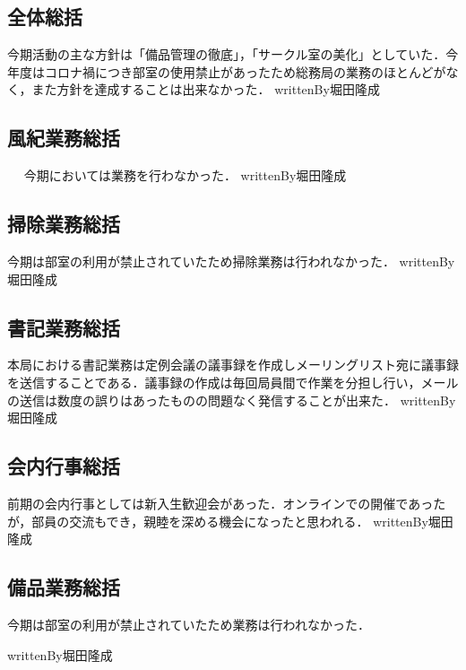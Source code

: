 \subsection*{全体総括}
今期活動の主な方針は「備品管理の徹底」，「サークル室の美化」としていた．今年度はコロナ禍につき部室の使用禁止があったため総務局の業務のほとんどがなく，また方針を達成することは出来なかった．
writtenBy{\soumuChief}{堀田}{隆成}

\subsection*{風紀業務総括}　
今期においては業務を行わなかった．
writtenBy{\soumuChief}{堀田}{隆成}

\subsection*{掃除業務総括}
今期は部室の利用が禁止されていたため掃除業務は行われなかった．
writtenBy{\soumuChief}{堀田}{隆成}

\subsection*{書記業務総括}
本局における書記業務は定例会議の議事録を作成しメーリングリスト宛に議事録を送信することである．議事録の作成は毎回局員間で作業を分担し行い，メールの送信は数度の誤りはあったものの問題なく発信することが出来た．
writtenBy{\soumuChief}{堀田}{隆成}

\subsection*{会内行事総括}
前期の会内行事としては新入生歓迎会があった．オンラインでの開催であったが，部員の交流もでき，親睦を深める機会になったと思われる．
writtenBy{\soumuChief}{堀田}{隆成}

\subsection*{備品業務総括}
今期は部室の利用が禁止されていたため業務は行われなかった．

writtenBy{\soumuChief}{堀田}{隆成}
